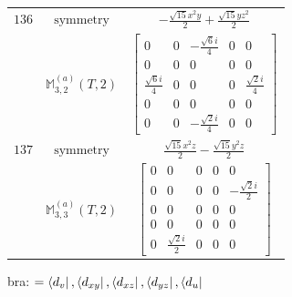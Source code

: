 \documentclass[fleqn,8pt,landscape]{jsarticle}
\begin{document}
\begin{longtable}{ccc}
$ 136 $ & $ \text{symmetry} $ & $ - \frac{\sqrt{15} x^{2} y}{2} + \frac{\sqrt{15} y z^{2}}{2} $ \\
$  $ & $ \mathbb{M}_{3,2}^{(a)}(T,2) $ & $ \begin{bmatrix} 0 & 0 & - \frac{\sqrt{6} i}{4} & 0 & 0 \\ 0 & 0 & 0 & 0 & 0 \\ \frac{\sqrt{6} i}{4} & 0 & 0 & 0 & \frac{\sqrt{2} i}{4} \\ 0 & 0 & 0 & 0 & 0 \\ 0 & 0 & - \frac{\sqrt{2} i}{4} & 0 & 0 \end{bmatrix} $ \\ \hline
$ 137 $ & $ \text{symmetry} $ & $ \frac{\sqrt{15} x^{2} z}{2} - \frac{\sqrt{15} y^{2} z}{2} $ \\
$  $ & $ \mathbb{M}_{3,3}^{(a)}(T,2) $ & $ \begin{bmatrix} 0 & 0 & 0 & 0 & 0 \\ 0 & 0 & 0 & 0 & - \frac{\sqrt{2} i}{2} \\ 0 & 0 & 0 & 0 & 0 \\ 0 & 0 & 0 & 0 & 0 \\ 0 & \frac{\sqrt{2} i}{2} & 0 & 0 & 0 \end{bmatrix} $ \\ \hline
\end{longtable}
bra: $=\bra{d_{v}}, \bra{d_{xy}}, \bra{d_{xz}}, \bra{d_{yz}}, \bra{d_{u}}$
\end{document}
